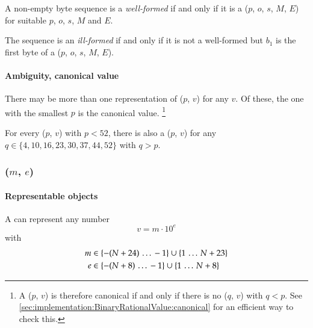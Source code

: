 A non-empty byte sequence  is a \emph{well-formed}
\DborBinaryRationalValue{} if and only if
it is a \DborBinaryRationalToken*($p$, $o$, $s$, $M$, $E$) for suitable $p$, $o$, $s$, $M$ and $E$.

The sequence is an \emph{ill-formed} \DborBinaryRationalValue{} if and only if it is not a well-formed
\DborBinaryRationalValue{} but $b_1$ is the first byte of a
\DborBinaryRationalToken*($p$, $o$, $s$, $M$, $E$).

\paragraph{Ambiguity, canonical value}

There may be more than one representation of \DborBinaryRationalValue($p$, $v$) for any $v$.
Of these, the one with the smallest $p$ is the canonical value.%
\footnote{
    A \DborBinaryRationalValue($p$, $v$) is therefore canonical if and only if there is
    no \DborBinaryRationalValue($q$, $v$) with $q < p$.
    See \ref{sec:implementation:BinaryRationalValue:canonical} for an efficient way to check this.
}

For every \DborBinaryRationalValue($p$, $v$) with $p < 52$, there is also
a \DborBinaryRationalValue($p$, $v$) for any
$q \in \{4, 10, 16, 23, 30, 37, 44, 52\}$ with $q > p$.


\subsubsection{\DborDecimalRationalValue(\texorpdfstring{$m$, $e$}{m, e})}
\hypertarget{sec:def:DecimalRationalValue}{}

\paragraph{Representable objects}

A \DborDecimalRationalValue{} can represent any number
\begin{equation}
    v = m \cdot 10^e
\end{equation}
with
\begin{align*}
    m & \in \{-(N + 24) \,\ldots\, -1\} \cup \{1 \,\ldots\, N + 23\} \\
    e & \in \{-(N + 8) \,\ldots\, -1\} \cup \{1 \,\ldots\, N + 8\}
\end{align*}

